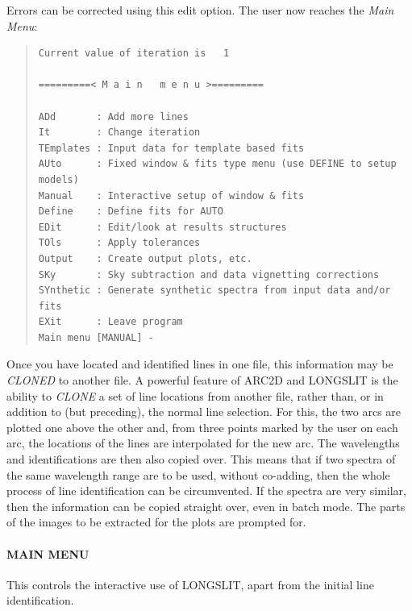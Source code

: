 Errors can be corrected using this edit option.
The user now reaches the {\it Main Menu}:

\begin{quote}\begin{verbatim}
Current value of iteration is   1
 
=========< M a i n   m e n u >=========
 
ADd       : Add more lines
It        : Change iteration
TEmplates : Input data for template based fits
AUto      : Fixed window & fits type menu (use DEFINE to setup models)
Manual    : Interactive setup of window & fits
Define    : Define fits for AUTO
EDit      : Edit/look at results structures
TOls      : Apply tolerances
Output    : Create output plots, etc.
SKy       : Sky subtraction and data vignetting corrections
SYnthetic : Generate synthetic spectra from input data and/or fits
EXit      : Leave program
Main menu [MANUAL] -
\end{verbatim}\end{quote}

Once you have located and identified lines in one file, this information
may be {\em CLONED} to another file.
A powerful feature of ARC2D and LONGSLIT
is the ability to {\em CLONE} a set of line locations from another
file, rather than, or in addition to (but preceding), the normal line
selection. For this, the two arcs are plotted one above the other
and, from three points marked by the user on each
arc, the locations of the lines are interpolated for the new arc. The
wavelengths and identifications are then also copied over. This means
that if two spectra of the same wavelength range are to be used,
without co-adding, then the whole process of line identification can be
circumvented. If the spectra are very similar, then the information can
be copied straight over, even in batch mode.
The parts of the images to be extracted for the plots are prompted for.

\paragraph{MAIN MENU}
\label{long.main}

This controls the interactive use of LONGSLIT, apart from the initial
line identification.

